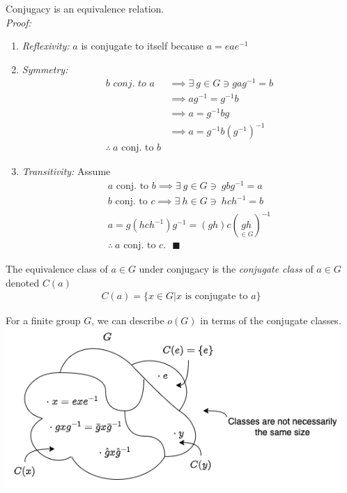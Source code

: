 \begin{lemma}
Conjugacy is an equivalence relation. \steezybreak\\
\noindent \textit{Proof:} 
\begin{enumerate}[label=\roman*)]
    \item \textit{Reflexivity:} $a$ is conjugate to itself because $a = eae^{-1}$
    \item \textit{Symmetry:} \begin{align}
        b \textit{ conj. to } a &\implies \exists \ g\in G \ni gag^{-1}=b \nonumber \\
        &\implies ag^{-1}=g^{-1}b \nonumber \\
        &\implies a= g^{-1}bg \nonumber \\
        &\implies a= g^{-1}b(g^{-1})^{-1} \nonumber \\
        \therefore \ a \text{ conj. to } b & \nonumber
    \end{align}
    \item \textit{Transitivity:} Assume \begin{align}
        a \text{ conj. to } b \implies \exists \ g \in G \ni \ gbg^{-1}=a \nonumber \\
        b \text{ conj. to } c \implies \exists \ h \in G \ni \ hch^{-1}=b \nonumber \\
        a = g(hch^{-1})g^{-1} = (gh)c(\underset{\in G}{gh})^{-1} \nonumber \\
        \therefore \ a \text{ conj. to } c. \ \ \ \blacksquare \nonumber
    \end{align}
\end{enumerate}
\end{lemma}
\begin{definition}
The equivalence class of $a\in G$ under conjugacy is the \textit{conjugate class} of $a\in G$ denoted $C(a)$
\begin{align}
    C(a)= \{x \in G | x \text{ is conjugate to } a\}
\end{align}
\end{definition}
For a finite group $G$, we can describe $o(G)$ in terms of the conjugate classes. \steezybreak\\
\includegraphics[width=0.95\textwidth]{Figures/Conjugacy_Partition.png}
